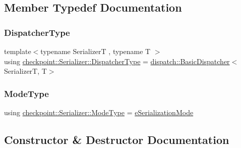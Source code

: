 \subsection{Member Typedef Documentation}
\mbox{\label{structcheckpoint_1_1_serializer_ad8effc5884f1ed37b6b4507422f6d72c}} 
\subsubsection{\texorpdfstring{Dispatcher\+Type}{DispatcherType}}
{\footnotesize\ttfamily template$<$typename SerializerT , typename T $>$ \\
using \hyperlink{structcheckpoint_1_1_serializer_ad8effc5884f1ed37b6b4507422f6d72c}{checkpoint\+::\+Serializer\+::\+Dispatcher\+Type} =  \hyperlink{structcheckpoint_1_1dispatch_1_1_basic_dispatcher}{dispatch\+::\+Basic\+Dispatcher}$<$SerializerT, T$>$}

\mbox{\label{structcheckpoint_1_1_serializer_a4c307e2592dc4224d8a13148109c5764}} 
\subsubsection{\texorpdfstring{Mode\+Type}{ModeType}}
{\footnotesize\ttfamily using \hyperlink{namespacecheckpoint_ae2509499ccd8b1dc48fb535bf8aa3059}{checkpoint\+::\+Serializer\+::\+Mode\+Type} =  \hyperlink{namespacecheckpoint_ae2509499ccd8b1dc48fb535bf8aa3059}{e\+Serialization\+Mode}}



\subsection{Constructor \& Destructor Documentation}
\mbox{\label{structcheckpoint_1_1_serializer_a4007a463384ec96a4c21bd7f049f0be5}} 
